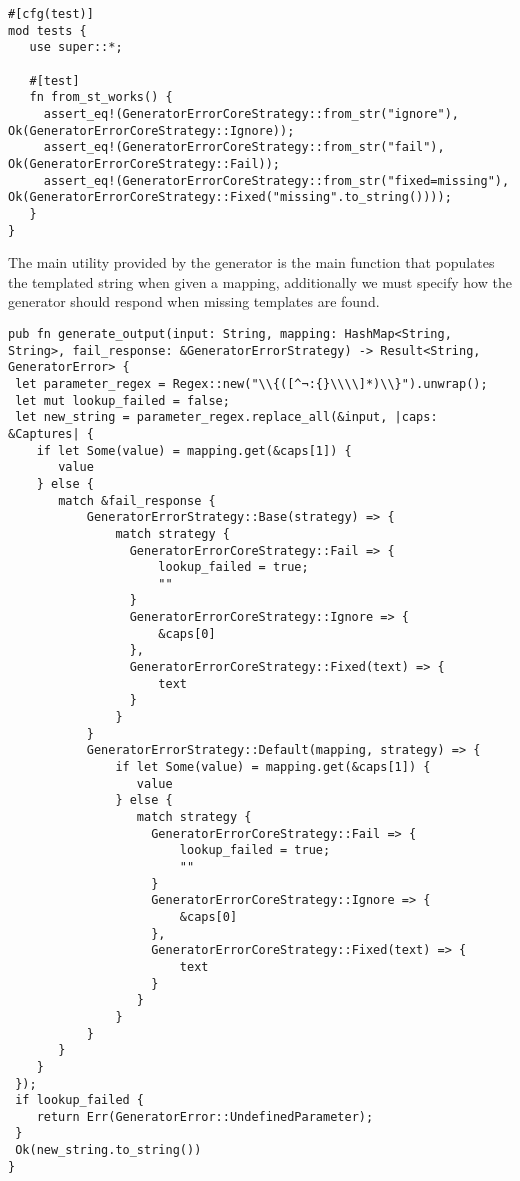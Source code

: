 \documentclass[11pt]{article}
\begin{document}
\begin{verbatim}
#[cfg(test)]
mod tests {
   use super::*;

   #[test]
   fn from_st_works() {
     assert_eq!(GeneratorErrorCoreStrategy::from_str("ignore"), Ok(GeneratorErrorCoreStrategy::Ignore));
     assert_eq!(GeneratorErrorCoreStrategy::from_str("fail"), Ok(GeneratorErrorCoreStrategy::Fail));
     assert_eq!(GeneratorErrorCoreStrategy::from_str("fixed=missing"), Ok(GeneratorErrorCoreStrategy::Fixed("missing".to_string())));
   }
}
\end{verbatim}


The main utility provided by the generator is the main function that populates the templated string when given a mapping, additionally we must specify how the generator should respond when missing templates are found.
\begin{verbatim}
pub fn generate_output(input: String, mapping: HashMap<String, String>, fail_response: &GeneratorErrorStrategy) -> Result<String, GeneratorError> {
 let parameter_regex = Regex::new("\\{([^¬:{}\\\\]*)\\}").unwrap();
 let mut lookup_failed = false;
 let new_string = parameter_regex.replace_all(&input, |caps: &Captures| {
    if let Some(value) = mapping.get(&caps[1]) {
       value
    } else {
       match &fail_response {
           GeneratorErrorStrategy::Base(strategy) => {
               match strategy {
                 GeneratorErrorCoreStrategy::Fail => {
                     lookup_failed = true;
                     ""
                 }
                 GeneratorErrorCoreStrategy::Ignore => {
                     &caps[0]
                 },
                 GeneratorErrorCoreStrategy::Fixed(text) => {
                     text
                 }
               }
           }
           GeneratorErrorStrategy::Default(mapping, strategy) => {
               if let Some(value) = mapping.get(&caps[1]) {
                  value
               } else {
                  match strategy {
                    GeneratorErrorCoreStrategy::Fail => {
                        lookup_failed = true;
                        ""
                    }
                    GeneratorErrorCoreStrategy::Ignore => {
                        &caps[0]
                    },
                    GeneratorErrorCoreStrategy::Fixed(text) => {
                        text
                    }
                  }  
               }
           }
       }  
    }
 });
 if lookup_failed {
    return Err(GeneratorError::UndefinedParameter);
 }
 Ok(new_string.to_string())
}
\end{verbatim}
\end{document}
